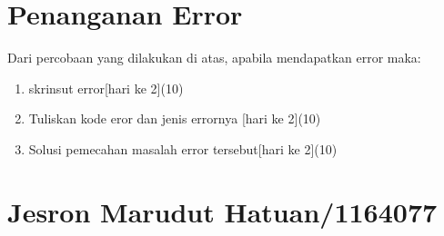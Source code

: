 \section{Penanganan Error}
Dari percobaan yang dilakukan di atas, apabila mendapatkan error maka:

\begin{enumerate}
	\item
	skrinsut error[hari ke 2](10)
	\item
Tuliskan kode eror dan jenis errornya [hari ke 2](10)
	\item
Solusi pemecahan masalah error tersebut[hari ke 2](10)

\end{enumerate}



\section{Jesron Marudut Hatuan/1164077}
